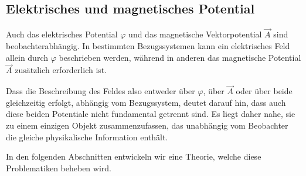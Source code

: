 \subsection{Elektrisches und magnetisches Potential}
\label{maxwell:gedankenexperiment:potentiale}

Auch das elektrisches Potential \( \varphi \) und das magnetische Vektorpotential \( \vec{A} \) sind beobachterabhängig.
In bestimmten Bezugssystemen kann ein elektrisches Feld allein durch \( \varphi \) beschrieben werden, während in anderen das magnetische Potential \( \vec{A} \) zusätzlich erforderlich ist.

Dass die Beschreibung des Feldes also entweder über \( \varphi \), über \( \vec{A} \) oder über beide gleichzeitig erfolgt, abhängig vom Bezugssystem, deutet darauf hin, dass auch diese beiden Potentiale nicht fundamental getrennt sind.
Es liegt daher nahe, sie zu einem einzigen Objekt zusammenzufassen, das unabhängig vom Beobachter die gleiche physikalische Information enthält.

In den folgenden Abschnitten entwickeln wir eine Theorie, welche diese Problematiken beheben wird.




